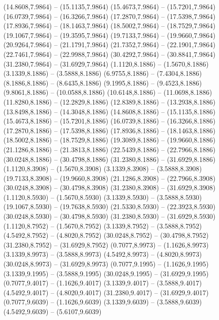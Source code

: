{\begin{scope}[shift={(#1,#2)}]
    (14.8608,7.9864) -- (15.1135,7.9864)
    (15.4673,7.9864) -- (15.7201,7.9864)
    (16.0739,7.9864) -- (16.3266,7.9864)
    (17.2870,7.9864) -- (17.5398,7.9864)
    (17.8936,7.9864) -- (18.1463,7.9864)
    (18.5002,7.9864) -- (18.7529,7.9864)
    (19.1067,7.9864) -- (19.3595,7.9864)
    (19.7133,7.9864) -- (19.9660,7.9864)
    (20.9264,7.9864) -- (21.1791,7.9864)
    (21.7352,7.9864) -- (22.1901,7.9864)
    (22.7461,7.9864) -- (22.9988,7.9864)
    (30.4292,7.9864) -- (30.8841,7.9864)
    (31.2380,7.9864) -- (31.6929,7.9864)
    (1.1120,8.1886) -- (1.5670,8.1886)
    (3.1339,8.1886) -- (3.5888,8.1886)
    (6.9755,8.1886) -- (7.4304,8.1886)
    (8.1886,8.1886) -- (8.6435,8.1886)
    (9.1995,8.1886) -- (9.4523,8.1886)
    (9.8061,8.1886) -- (10.0588,8.1886)
    (10.6148,8.1886) -- (11.0698,8.1886)
    (11.8280,8.1886) -- (12.2829,8.1886)
    (12.8389,8.1886) -- (13.2938,8.1886)
    (13.8498,8.1886) -- (14.3048,8.1886)
    (14.8608,8.1886) -- (15.1135,8.1886)
    (15.4673,8.1886) -- (15.7201,8.1886)
    (16.0739,8.1886) -- (16.3266,8.1886)
    (17.2870,8.1886) -- (17.5398,8.1886)
    (17.8936,8.1886) -- (18.1463,8.1886)
    (18.5002,8.1886) -- (18.7529,8.1886)
    (19.3089,8.1886) -- (19.9660,8.1886)
    (21.1286,8.1886) -- (21.3813,8.1886)
    (22.5439,8.1886) -- (22.7966,8.1886)
    (30.0248,8.1886) -- (30.4798,8.1886)
    (31.2380,8.1886) -- (31.6929,8.1886)
    (1.1120,8.3908) -- (1.5670,8.3908)
    (3.1339,8.3908) -- (3.5888,8.3908)
    (19.7133,8.3908) -- (19.9660,8.3908)
    (21.1286,8.3908) -- (22.7966,8.3908)
    (30.0248,8.3908) -- (30.4798,8.3908)
    (31.2380,8.3908) -- (31.6929,8.3908)
    (1.1120,8.5930) -- (1.5670,8.5930)
    (3.1339,8.5930) -- (3.5888,8.5930)
    (19.1067,8.5930) -- (19.7638,8.5930)
    (21.5330,8.5930) -- (22.3923,8.5930)
    (30.0248,8.5930) -- (30.4798,8.5930)
    (31.2380,8.5930) -- (31.6929,8.5930)
    (1.1120,8.7952) -- (1.5670,8.7952)
    (3.1339,8.7952) -- (3.5888,8.7952)
    (4.5492,8.7952) -- (4.8020,8.7952)
    (30.0248,8.7952) -- (30.4798,8.7952)
    (31.2380,8.7952) -- (31.6929,8.7952)
    (0.7077,8.9973) -- (1.1626,8.9973)
    (3.1339,8.9973) -- (3.5888,8.9973)
    (4.5492,8.9973) -- (4.8020,8.9973)
    (30.0248,8.9973) -- (31.6929,8.9973)
    (0.7077,9.1995) -- (1.1626,9.1995)
    (3.1339,9.1995) -- (3.5888,9.1995)
    (30.0248,9.1995) -- (31.6929,9.1995)
    (0.7077,9.4017) -- (1.1626,9.4017)
    (3.1339,9.4017) -- (3.5888,9.4017)
    (4.5492,9.4017) -- (4.8020,9.4017)
    (31.2380,9.4017) -- (31.6929,9.4017)
    (0.7077,9.6039) -- (1.1626,9.6039)
    (3.1339,9.6039) -- (3.5888,9.6039)
    (4.5492,9.6039) -- (5.6107,9.6039)

\end{scope}}

